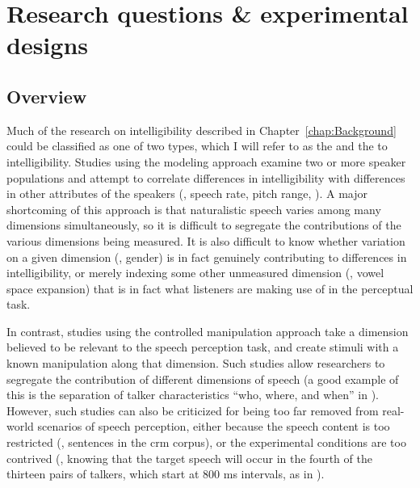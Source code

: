 \chapter{Research questions \& experimental designs\label{chap:Questions}}

\section{Overview}
Much of the research on intelligibility described in Chapter~\ref{chap:Background} could be classified as one of two types, which I will refer to as the  and the  to intelligibility.  Studies using the modeling approach examine two or more speaker populations and attempt to correlate differences in intelligibility with differences in other attributes of the speakers (\eg, speech rate, pitch range, \etc).\footnotemark{}  A major shortcoming of this approach is that naturalistic speech varies among many dimensions simultaneously, so it is difficult to segregate the contributions of the various dimensions being measured.  It is also difficult to know whether variation on a given dimension (\eg, gender) is in fact genuinely contributing to differences in intelligibility, or merely indexing some other unmeasured dimension (\eg, vowel space expansion) that is in fact what listeners are making use of in the perceptual task.


In contrast, studies using the controlled manipulation approach take a dimension believed to be relevant to the speech perception task, and create stimuli with a known manipulation along that dimension.\footnotemark{}  Such studies allow researchers to segregate the contribution of different dimensions of speech (a good example of this is the separation of talker characteristics “who, where, and when” in \citealt{KitterickEtAl2010}).  However, such studies can also be criticized for being too far removed from real-world scenarios of speech perception, either because the speech content is too restricted (\ie, sentences in the \ac{crm} corpus), or the experimental conditions are too contrived (\eg, knowing that the target speech will occur in the fourth of the thirteen pairs of talkers, which start at 800 ms intervals, as in \citealt{KitterickEtAl2010}).


